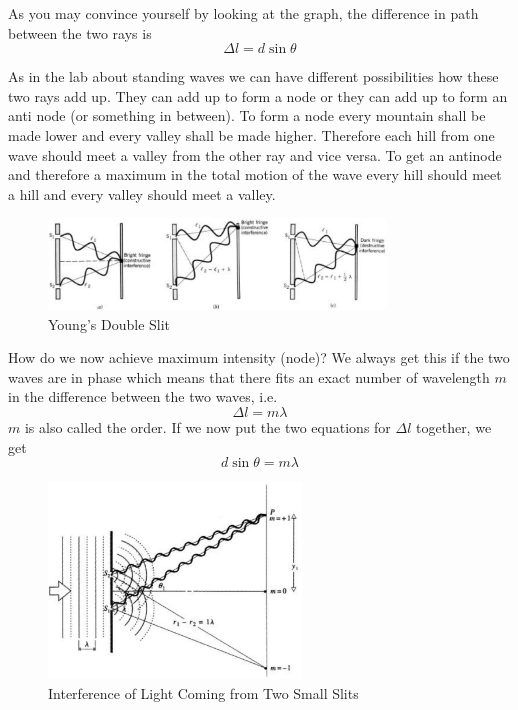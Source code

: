 As you may convince yourself by looking at the graph, the difference in path between the two rays is
\begin{equation}
  \Delta l =d\sin\theta
\end{equation}

As in the lab about standing waves we can have different possibilities how these two rays add up. They can add up to form a node or they can add up to form an anti node (or something in between). To form a node every mountain shall be made lower and every valley shall be made higher. Therefore each hill from one wave should meet a valley from the other ray and vice versa. To get an antinode and therefore a maximum in the total motion of the wave every hill should meet a hill and every valley should meet a valley.
\begin{figure}[h]
\centering
\includegraphics[width=0.8\textwidth]{./Exp9/pic/image2.png}
\caption{Young's Double Slit}
\end{figure}

How do we now achieve maximum intensity (node)? We always get this if the two waves are in phase which means that there fits an exact number of wavelength $m$ in the difference between the two waves, i.e.
\begin{equation}
  \Delta l=m\lambda
\end{equation}
$m$ is also called the order. If we now put the two equations for $\Delta l$ together, we get
\begin{equation}
  d\sin\theta=m\lambda
  \label{eq:dsin}
\end{equation}
\begin{figure}[h]
\centering
\includegraphics[width=0.6\textwidth]{./Exp9/pic/image3.png}
\caption{Interference of Light Coming from Two Small Slits}
\end{figure}

